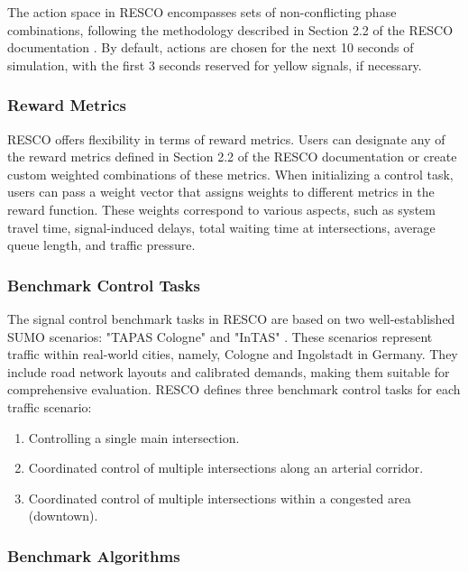 The action space in RESCO encompasses sets of non-conflicting phase combinations, following the methodology described in Section 2.2 of the RESCO documentation \cite{codeca2018monaco}. By default, actions are chosen for the next 10 seconds of simulation, with the first 3 seconds reserved for yellow signals, if necessary.

\subsubsection{Reward Metrics}

RESCO offers flexibility in terms of reward metrics. Users can designate any of the reward metrics defined in Section 2.2 of the RESCO documentation\cite{codeca2018monaco} or create custom weighted combinations of these metrics. When initializing a control task, users can pass a weight vector that assigns weights to different metrics in the reward function. These weights correspond to various aspects, such as system travel time, signal-induced delays, total waiting time at intersections, average queue length, and traffic pressure.

\subsubsection{Benchmark Control Tasks}

The signal control benchmark tasks in RESCO are based on two well-established SUMO scenarios: "TAPAS Cologne" and "InTAS" \cite{pham2013learning, lobo2020intas}. These scenarios represent traffic within real-world cities, namely, Cologne and Ingolstadt in Germany. They include road network layouts and calibrated demands, making them suitable for comprehensive evaluation. RESCO defines three benchmark control tasks for each traffic scenario:

\begin{enumerate}
    \item Controlling a single main intersection.
    \item Coordinated control of multiple intersections along an arterial corridor.
    \item Coordinated control of multiple intersections within a congested area (downtown).
\end{enumerate}

\subsubsection{Benchmark Algorithms}

